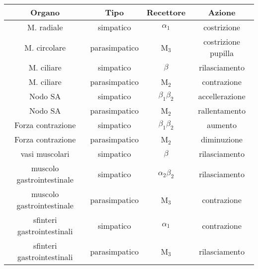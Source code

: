 

\begin{tabular}{|c|c|c|c|}
\hline 
\textbf{Organo} & \textbf{Tipo} & \textbf{Recettore} & \textbf{Azione} \\ 
\hline\hline 
M. radiale & simpatico & $\alpha_1$ & costrizione \\ 
\hline 
M. circolare & parasimpatico & M${}_3$ & costrizione pupilla \\ 
\hline 
M. ciliare & simpatico & $\beta$ & rilasciamento \\ 
\hline 
M. ciliare & parasimpatico & M${}_2$ & contrazione \\ 
\hline 
Nodo SA & simpatico & $\beta_1\beta_2$ & accellerazione \\ 
\hline 
Nodo SA & parasimpatico & M${}_2$ & rallentamento \\ 
\hline 
Forza contrazione & simpatico & $\beta_1\beta_2$ & aumento \\ 
\hline 
Forza contrazione & parasimpatico & M${}_2$ & diminuzione \\ 
\hline 
vasi muscolari & simpatico & $\beta$ & rilasciamento \\ 
\hline 
muscolo gastrointestinale & simpatico & $\alpha_2\beta_2$ & rilasciamento \\ 
\hline 
muscolo gastrointestinale & parasimpatico & M${}_3$ & contrazione \\ 
\hline 
sfinteri gastrointestinali & simpatico & $\alpha_1$ & contrazione \\ 
\hline 
sfinteri gastrointestinali & parasimpatico & M${}_3$ & rilasciamento \\ 
\hline 
\end{tabular} 

